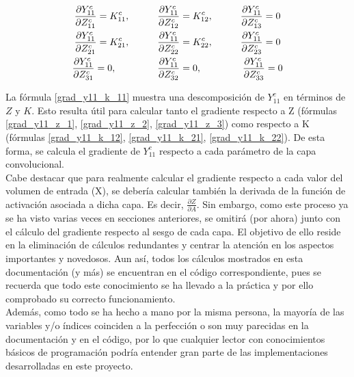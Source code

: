 \begin{gather}
	\frac{\partial Y^c_{11}}{\partial Z^c_{11}} = K^c_{11}, \hspace{10mm} \frac{\partial Y^c_{11}}{\partial Z^c_{12}} = K^c_{12}, \hspace{10mm} \frac{\partial Y^c_{11}}{\partial Z^c_{13}} = 0 \label{grad_y11_z_1} \\
	\frac{\partial Y^c_{11}}{\partial Z^c_{21}} = K^c_{21}, \hspace{10mm} \frac{\partial Y^c_{11}}{\partial Z^c_{22}} = K^c_{22}, \hspace{10mm} \frac{\partial Y^c_{11}}{\partial Z^c_{23}} = 0 \label{grad_y11_z_2} \\
	\frac{\partial Y^c_{11}}{\partial Z^c_{31}} = 0, \hspace{15mm} \frac{\partial Y^c_{11}}{\partial Z^c_{32}} = 0, \hspace{15mm} \frac{\partial Y^c_{11}}{\partial Z^c_{33}} = 0 \label{grad_y11_z_3}
\end{gather}

La fórmula \ref{grad_y11_k_11} muestra una descomposición de $Y^c_{11}$ en términos de $Z$ y $K$. Esto resulta útil para calcular tanto el gradiente respecto a Z (fórmulas \ref{grad_y11_z_1}, \ref{grad_y11_z_2}, \ref{grad_y11_z_3}) como respecto a K (fórmulas \ref{grad_y11_k_12}, \ref{grad_y11_k_21}, \ref{grad_y11_k_22}). De esta forma, se calcula el gradiente de $Y^c_{11}$ respecto a cada parámetro de la capa convolucional. \\
Cabe destacar que para realmente calcular el gradiente respecto a cada valor del volumen de entrada (X), se debería calcular también la derivada de la función de activación asociada a dicha capa. Es decir, $\frac{\partial Z}{\partial A}$. Sin embargo, como este proceso ya se ha visto varias veces en secciones anteriores, se omitirá (por ahora) junto con el cálculo del gradiente respecto al sesgo de cada capa. El objetivo de ello reside en la eliminación de cálculos redundantes y centrar la atención en los aspectos importantes y novedosos. Aun así, todos los cálculos mostrados en esta documentación (y más) se encuentran en el código correspondiente, pues se recuerda que todo este conocimiento se ha llevado a la práctica y por ello comprobado su correcto funcionamiento. \\
Además, como todo se ha hecho a mano por la misma persona, la mayoría de las variables y/o índices coinciden a la perfección o son muy parecidas en la documentación y en el código, por lo que cualquier lector con conocimientos básicos de programación podría entender gran parte de las implementaciones desarrolladas en este proyecto.

